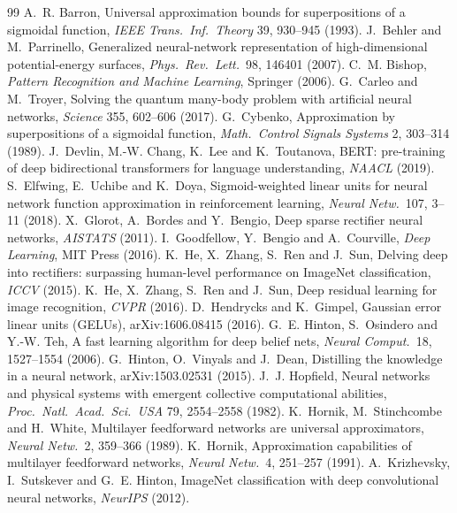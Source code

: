 \documentclass[11pt]{article}
\begin{document}
\begin{thebibliography}{99}\small
{} A.~R. Barron, Universal approximation bounds for superpositions of a sigmoidal function, \emph{IEEE Trans.\ Inf.\ Theory} 39, 930--945 (1993).
 J.~Behler and M.~Parrinello, Generalized neural-network representation of high-dimensional potential-energy surfaces, \emph{Phys.\ Rev.\ Lett.}\ 98, 146401 (2007).
 C.~M. Bishop, \emph{Pattern Recognition and Machine Learning}, Springer (2006).
 G.~Carleo and M.~Troyer, Solving the quantum many-body problem with artificial neural networks, \emph{Science} 355, 602--606 (2017).
 G.~Cybenko, Approximation by superpositions of a sigmoidal function, \emph{Math.\ Control Signals Systems} 2, 303--314 (1989).
 J.~Devlin, M.-W. Chang, K.~Lee and K.~Toutanova, BERT: pre-training of deep bidirectional transformers for language understanding, \emph{NAACL} (2019).
 S.~Elfwing, E.~Uchibe and K.~Doya, Sigmoid-weighted linear units for neural network function approximation in reinforcement learning, \emph{Neural Netw.}\ 107, 3--11 (2018).
 X.~Glorot, A.~Bordes and Y.~Bengio, Deep sparse rectifier neural networks, \emph{AISTATS} (2011).
 I.~Goodfellow, Y.~Bengio and A.~Courville, \emph{Deep Learning}, MIT Press (2016).
 K.~He, X.~Zhang, S.~Ren and J.~Sun, Delving deep into rectifiers: surpassing human-level performance on ImageNet classification, \emph{ICCV} (2015).
 K.~He, X.~Zhang, S.~Ren and J.~Sun, Deep residual learning for image recognition, \emph{CVPR} (2016).
 D.~Hendrycks and K.~Gimpel, Gaussian error linear units (GELUs), arXiv:1606.08415 (2016).
 G.~E. Hinton, S.~Osindero and Y.-W. Teh, A fast learning algorithm for deep belief nets, \emph{Neural Comput.}\ 18, 1527--1554 (2006).
 G.~Hinton, O.~Vinyals and J.~Dean, Distilling the knowledge in a neural network, arXiv:1503.02531 (2015).
 J.~J. Hopfield, Neural networks and physical systems with emergent collective computational abilities, \emph{Proc.\ Natl.\ Acad.\ Sci.\ USA} 79, 2554--2558 (1982).
 K.~Hornik, M.~Stinchcombe and H.~White, Multilayer feedforward networks are universal approximators, \emph{Neural Netw.}\ 2, 359--366 (1989).
 K.~Hornik, Approximation capabilities of multilayer feedforward networks, \emph{Neural Netw.}\ 4, 251--257 (1991).
 A.~Krizhevsky, I.~Sutskever and G.~E. Hinton, ImageNet classification with deep convolutional neural networks, \emph{NeurIPS} (2012).

\end{thebibliography}
\end{document}
